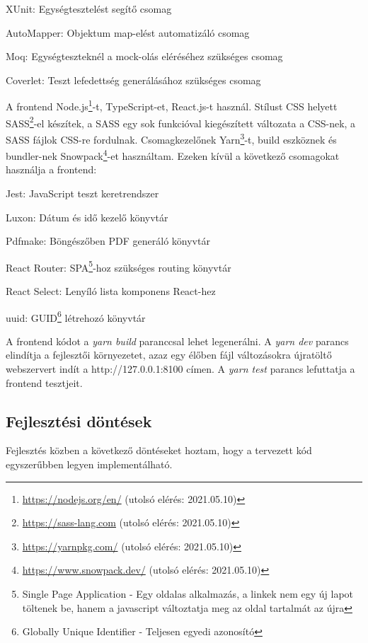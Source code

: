 \begin{compactitem}
	\item XUnit: Egységtesztelést segítő csomag
	\item AutoMapper: Objektum map-elést automatizáló csomag
	\item Moq: Egységteszteknél a mock-olás eléréséhez szükséges csomag
	\item Coverlet: Teszt lefedettség generálásához szükséges csomag
\end{compactitem}

A frontend Node.js\footnote{\url{https://nodejs.org/en/} (utolsó elérés: 2021.05.10)}-t, TypeScript-et, React.js-t használ. Stílust CSS helyett SASS\footnote{\url{https://sass-lang.com} (utolsó elérés: 2021.05.10)}-el készítek, a SASS egy sok funkcióval kiegészített változata a CSS-nek, a SASS fájlok CSS-re fordulnak. Csomagkezelőnek Yarn\footnote{\url{https://yarnpkg.com/} (utolsó elérés: 2021.05.10)}-t, build eszköznek és bundler-nek Snowpack\footnote{\url{https://www.snowpack.dev/} (utolsó elérés: 2021.05.10)}-et használtam. Ezeken kívül a következő csomagokat használja a frontend:

\begin{compactitem}
	\item Jest: JavaScript teszt keretrendszer
	\item Luxon: Dátum és idő kezelő könyvtár
	\item Pdfmake: Böngészőben PDF generáló könyvtár
	\item React Router: SPA\footnote{Single Page Application - Egy oldalas alkalmazás, a linkek nem egy új lapot töltenek be, hanem a javascript változtatja meg az oldal tartalmát az újra}-hoz szükséges routing könyvtár
	\item React Select: Lenyíló lista komponens React-hez
	\item uuid: GUID\footnote{Globally Unique Identifier - Teljesen egyedi azonosító} létrehozó könyvtár
\end{compactitem}

A frontend kódot a \textit{yarn build} paranccsal lehet legenerálni. A \textit{yarn dev} parancs elindítja a fejlesztői környezetet, azaz egy élőben fájl változásokra újratöltő webszervert indít a http://127.0.0.1:8100 címen. A \textit{yarn test} parancs lefuttatja a frontend tesztjeit.


\subsection{Fejlesztési döntések}
Fejlesztés közben a következő döntéseket hoztam, hogy a tervezett kód egyszerűbben legyen implementálható.

